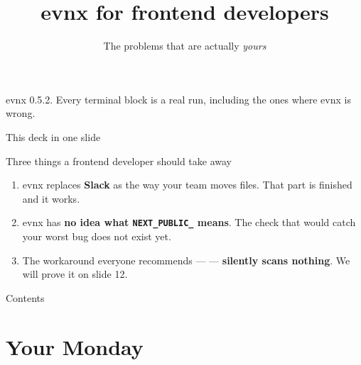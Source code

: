 \documentclass[aspectratio=169,10pt]{beamer}
\title{evnx for frontend developers}
\subtitle{The \file{.env} problems that are actually \emph{yours}}
\date{}
\begin{document}
\begin{frame}[plain]
  \titlepage
  \begin{center}\footnotesize
  \textcolor{evnxMuted}{evnx 0.5.2. Every terminal block is a real run, including
  the ones where evnx is wrong.}
  \end{center}
\end{frame}

\begin{frame}{This deck in one slide}
  \begin{block}{Three things a frontend developer should take away}
    \begin{enumerate}
      \item evnx replaces \textbf{Slack} as the way your team moves
             files. That part is finished and it works.
      \item evnx has \textbf{no idea what \texttt{NEXT\_PUBLIC\_} means}.
            The check that would catch your worst bug does not exist yet.
      \item The workaround everyone recommends ---
             --- \textbf{silently scans nothing}.
            We will prove it on slide 12.
    \end{enumerate}
  \end{block}
\end{frame}

\begin{frame}{Contents}\tableofcontents[hideallsubsections]\end{frame}

\section{Your Monday}
\end{document}
